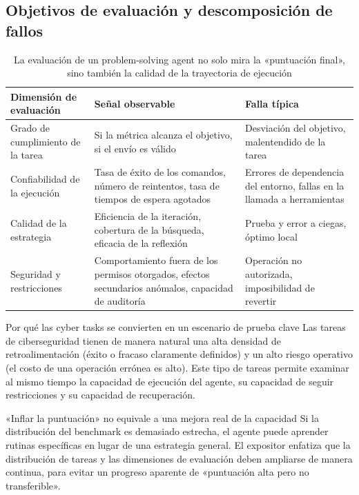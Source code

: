\documentclass[a4paper]{article}
\begin{document}
\subsection{Objetivos de evaluación y descomposición de fallos}
\begin{table}[H]
\centering
\begin{tabular}{p{2.8cm}p{4.0cm}p{4.8cm}}
\toprule
\textbf{Dimensión de evaluación} & \textbf{Señal observable} & \textbf{Falla típica} \\
\midrule
Grado de cumplimiento de la tarea & Si la métrica alcanza el objetivo, si el envío es válido & Desviación del objetivo, malentendido de la tarea \\
Confiabilidad de la ejecución & Tasa de éxito de los comandos, número de reintentos, tasa de tiempos de espera agotados & Errores de dependencia del entorno, fallas en la llamada a herramientas \\
Calidad de la estrategia & Eficiencia de la iteración, cobertura de la búsqueda, eficacia de la reflexión & Prueba y error a ciegas, óptimo local \\
Seguridad y restricciones & Comportamiento fuera de los permisos otorgados, efectos secundarios anómalos, capacidad de auditoría & Operación no autorizada, imposibilidad de revertir \\
\bottomrule
\end{tabular}
\caption{La evaluación de un problem-solving agent no solo mira la «puntuación final», sino también la calidad de la trayectoria de ejecución}
\end{table}

\begin{knowledgebox}{Por qué las cyber tasks se convierten en un escenario de prueba clave}
Las tareas de ciberseguridad tienen de manera natural una alta densidad de retroalimentación (éxito o fracaso claramente definidos) y un alto riesgo operativo (el costo de una operación errónea es alto).  
Este tipo de tareas permite examinar al mismo tiempo la capacidad de ejecución del agente, su capacidad de seguir restricciones y su capacidad de recuperación.
\end{knowledgebox}

\begin{warningbox}{«Inflar la puntuación» no equivale a una mejora real de la capacidad}
Si la distribución del benchmark es demasiado estrecha, el agente puede aprender rutinas específicas en lugar de una estrategia general.  
El expositor enfatiza que la distribución de tareas y las dimensiones de evaluación deben ampliarse de manera continua, para evitar un progreso aparente de «puntuación alta pero no transferible».
\end{warningbox}
\end{document}
